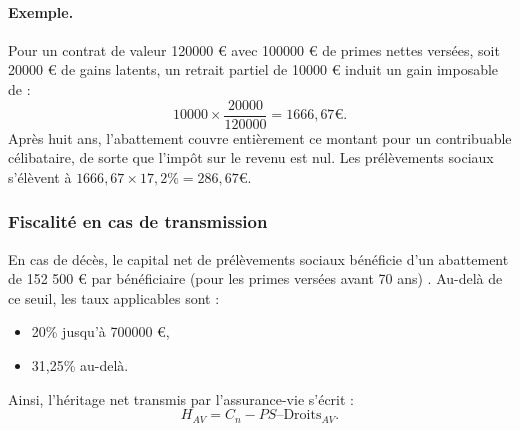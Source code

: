 \paragraph{Exemple.} Pour un contrat de valeur 120000 € avec 100000 € de primes nettes versées, soit 20000 € de gains latents, un retrait partiel de 10000 € induit un gain imposable de :
\[ 10000 \times \frac{20000}{120000} = 1666,67€. \]
Après huit ans, l'abattement couvre entièrement ce montant pour un contribuable célibataire, de sorte que l'impôt sur le revenu est nul. Les prélèvements sociaux s'élèvent à \(1666,67 \times 17,2\% = 286,67 €\).

\subsubsection{Fiscalité en cas de transmission}
\label{sec:fiscalite_transmission}

En cas de décès, le capital net de prélèvements sociaux bénéficie d'un abattement de 152 500 € par bénéficiaire (pour les primes versées avant 70 ans) \cite{cgi_990i, cgi_757b}. Au-delà de ce seuil, les taux applicables sont \cite{bofip_mutations_av}:
\begin{itemize}
    \item 20\% jusqu'à 700000 €,
    \item 31,25\% au-delà.
\end{itemize}
Ainsi, l'héritage net transmis par l'assurance-vie s'écrit :
\begin{equation}
    H_{AV} = C_n - PS – \text{Droits}_{AV}.
\end{equation}
